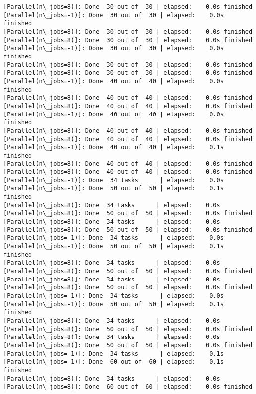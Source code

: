 \documentclass[11pt]{article}
\begin{document}
\begin{Verbatim}[commandchars=\\\{\}]
[Parallel(n\_jobs=8)]: Done  30 out of  30 | elapsed:    0.0s finished
[Parallel(n\_jobs=-1)]: Done  30 out of  30 | elapsed:    0.0s finished
[Parallel(n\_jobs=8)]: Done  30 out of  30 | elapsed:    0.0s finished
[Parallel(n\_jobs=8)]: Done  30 out of  30 | elapsed:    0.0s finished
[Parallel(n\_jobs=-1)]: Done  30 out of  30 | elapsed:    0.0s finished
[Parallel(n\_jobs=8)]: Done  30 out of  30 | elapsed:    0.0s finished
[Parallel(n\_jobs=8)]: Done  30 out of  30 | elapsed:    0.0s finished
[Parallel(n\_jobs=-1)]: Done  40 out of  40 | elapsed:    0.0s finished
[Parallel(n\_jobs=8)]: Done  40 out of  40 | elapsed:    0.0s finished
[Parallel(n\_jobs=8)]: Done  40 out of  40 | elapsed:    0.0s finished
[Parallel(n\_jobs=-1)]: Done  40 out of  40 | elapsed:    0.0s finished
[Parallel(n\_jobs=8)]: Done  40 out of  40 | elapsed:    0.0s finished
[Parallel(n\_jobs=8)]: Done  40 out of  40 | elapsed:    0.0s finished
[Parallel(n\_jobs=-1)]: Done  40 out of  40 | elapsed:    0.1s finished
[Parallel(n\_jobs=8)]: Done  40 out of  40 | elapsed:    0.0s finished
[Parallel(n\_jobs=8)]: Done  40 out of  40 | elapsed:    0.0s finished
[Parallel(n\_jobs=-1)]: Done  34 tasks      | elapsed:    0.0s
[Parallel(n\_jobs=-1)]: Done  50 out of  50 | elapsed:    0.1s finished
[Parallel(n\_jobs=8)]: Done  34 tasks      | elapsed:    0.0s
[Parallel(n\_jobs=8)]: Done  50 out of  50 | elapsed:    0.0s finished
[Parallel(n\_jobs=8)]: Done  34 tasks      | elapsed:    0.0s
[Parallel(n\_jobs=8)]: Done  50 out of  50 | elapsed:    0.0s finished
[Parallel(n\_jobs=-1)]: Done  34 tasks      | elapsed:    0.0s
[Parallel(n\_jobs=-1)]: Done  50 out of  50 | elapsed:    0.1s finished
[Parallel(n\_jobs=8)]: Done  34 tasks      | elapsed:    0.0s
[Parallel(n\_jobs=8)]: Done  50 out of  50 | elapsed:    0.0s finished
[Parallel(n\_jobs=8)]: Done  34 tasks      | elapsed:    0.0s
[Parallel(n\_jobs=8)]: Done  50 out of  50 | elapsed:    0.0s finished
[Parallel(n\_jobs=-1)]: Done  34 tasks      | elapsed:    0.0s
[Parallel(n\_jobs=-1)]: Done  50 out of  50 | elapsed:    0.1s finished
[Parallel(n\_jobs=8)]: Done  34 tasks      | elapsed:    0.0s
[Parallel(n\_jobs=8)]: Done  50 out of  50 | elapsed:    0.0s finished
[Parallel(n\_jobs=8)]: Done  34 tasks      | elapsed:    0.0s
[Parallel(n\_jobs=8)]: Done  50 out of  50 | elapsed:    0.0s finished
[Parallel(n\_jobs=-1)]: Done  34 tasks      | elapsed:    0.1s
[Parallel(n\_jobs=-1)]: Done  60 out of  60 | elapsed:    0.1s finished
[Parallel(n\_jobs=8)]: Done  34 tasks      | elapsed:    0.0s
[Parallel(n\_jobs=8)]: Done  60 out of  60 | elapsed:    0.0s finished

\end{Verbatim}
\end{document}
